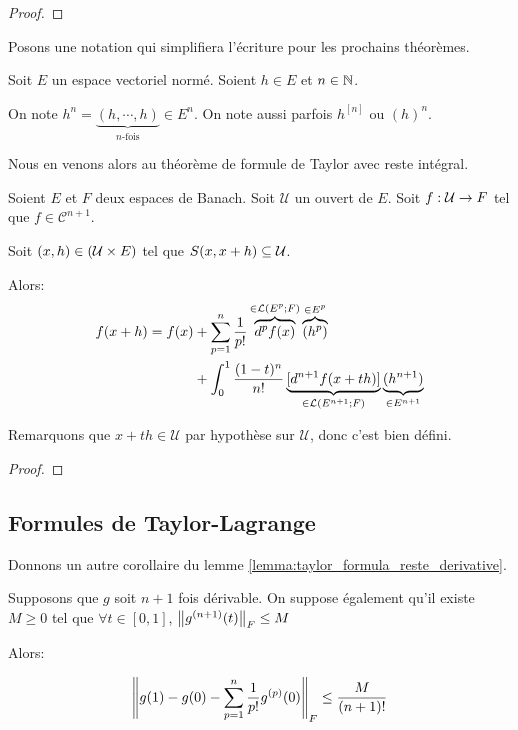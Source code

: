 \ifdefined\outputproof
\begin{proof}

\end{proof}
\fi

Posons une notation qui simplifiera l'écriture pour les prochains théorèmes.

\begin{notation}
	Soit $E$ un espace vectoriel normé. Soient $h \in E$ et $n \in \mathbb{N}$.

	On note $h^{n} = \underbrace{(h, \cdots, h)}_{\text{$n$-fois}} \in E^{n}$.
	On note aussi parfois $h^{[n]}$ ou $(h)^{n}$.
\end{notation}

Nous en venons alors au théorème de formule de Taylor avec reste intégral.

\begin{theorem}
	\label{theorem:taylor_formula_reste_integral}
	Soient $E$ et $F$ deux espaces de Banach. Soit $\mathcal{U}$ un ouvert de
	$E$.
	Soit $f : \mathcal{U} \rightarrow F$ tel que $f \in \mathcal{C}^{n + 1}$.

	Soit $(x, h) \in (\mathcal{U} \times E)$ tel que $S(x, x + h)
	\subseteq \mathcal{U}$.

	Alors:
	\begin{align*}
		f(x + h) = f(x) & + \displaystyle \sum_{p = 1}^{n} \frac{1}{p!}
		\overbrace{d^{p}f(x)}^{\in \mathcal{L}(E^{p}; F)}
		\overbrace{(h^{p})}^{\in E^{p}} \\
		& + \int_{0}^{1} \frac{(1 - t)^{n}}{n!} \underbrace{[d^{n + 1}f(x +
		th)]}_{\in \mathcal{L}(E^{n+1}; F)} \underbrace{(h^{n+1})}_{\in E^{n +
		1}}
	\end{align*}

	Remarquons que $x + th \in \mathcal{U}$ par hypothèse sur $\mathcal{U}$,
	donc c'est bien défini.
\end{theorem}

\ifdefined\outputproof
\begin{proof}

\end{proof}
\fi

\subsection{Formules de Taylor-Lagrange}

Donnons un autre corollaire du lemme
\ref{lemma:taylor_formula_reste_derivative}.

\begin{corollary}
	Supposons que $g$ soit $n + 1$ fois dérivable.
	On suppose également qu'il existe $M \geq 0$ tel que $\forall t \in [0, 1]$,
	$\norm{g^{(n + 1)}(t)}_{F} \leq M$

	Alors:

	\begin{equation*}
		\norm{g(1) - g(0) - \displaystyle \sum_{p = 1}^{n} \frac{1}{p!}
		g^{(p)}(0)}_{F} \leq \frac{M}{(n + 1)!}
	\end{equation*}
\end{corollary}

